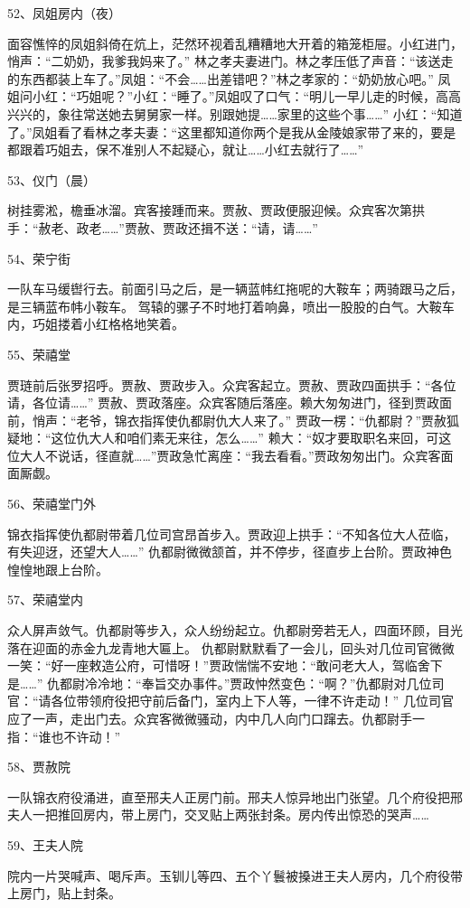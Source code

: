 52、凤姐房内（夜）\par
面容憔悴的凤姐斜倚在炕上，茫然环视着乱糟糟地大开着的箱笼柜屉。小红进门，悄声：“二奶奶，我爹我妈来了。”
林之孝夫妻进门。林之孝压低了声音：“该送走的东西都装上车了。”凤姐：“不会……出差错吧？”林之孝家的：“奶奶放心吧。”
凤姐问小红：“巧姐呢？”小红：“睡了。”凤姐叹了口气：“明儿一早儿走的时候，高高兴兴的，象往常送她去舅舅家一样。别跟她提……家里的这些个事……”
小红：“知道了。”凤姐看了看林之孝夫妻：“这里都知道你两个是我从金陵娘家带了来的，要是都跟着巧姐去，保不准别人不起疑心，就让……小红去就行了……”

53、仪门（晨）\par
树挂雾淞，檐垂冰溜。宾客接踵而来。贾赦、贾政便服迎候。众宾客次第拱手：“赦老、政老……”贾赦、贾政还揖不送：“请，请……”

54、荣宁街\par
一队车马缓辔行去。前面引马之后，是一辆蓝帏红拖呢的大鞍车；两骑跟马之后，是三辆蓝布帏小鞍车。
驾辕的骡子不时地打着响鼻，喷出一股股的白气。大鞍车内，巧姐搂着小红格格地笑着。

55、荣禧堂\par
贾琏前后张罗招呼。贾赦、贾政步入。众宾客起立。贾赦、贾政四面拱手：“各位请，各位请……”
贾赦、贾政落座。众宾客随后落座。赖大匆匆进门，径到贾政面前，悄声：“老爷，锦衣指挥使仇都尉仇大人来了。”
贾政一楞：“仇都尉？”贾赦狐疑地：“这位仇大人和咱们素无来往，怎么……”
赖大：“奴才要取职名来回，可这位大人不说话，径直就……”贾政急忙离座：“我去看看。”贾政匆匆出门。众宾客面面厮觑。

56、荣禧堂门外\par
锦衣指挥使仇都尉带着几位司宫昂首步入。贾政迎上拱手：“不知各位大人莅临，有失迎迓，还望大人……”
仇都尉微微颔首，并不停步，径直步上台阶。贾政神色惶惶地跟上台阶。

57、荣禧堂内\par
众人屏声敛气。仇都尉等步入，众人纷纷起立。仇都尉旁若无人，四面环顾，目光落在迎面的赤金九龙青地大匾上。
仇都尉默默看了一会儿，回头对几位司官微微一笑：“好一座敕造公府，可惜呀！”贾政惴惴不安地：“敢问老大人，驾临舍下是……”
仇都尉冷冷地：“奉旨交办事件。”贾政忡然变色：“啊？”仇都尉对几位司官：“请各位带领府役把守前后备门，室内上下人等，一律不许走动！”
几位司官应了一声，走出门去。众宾客微微骚动，内中几人向门口蹿去。仇都尉手一指：“谁也不许动！”

58、贾赦院\par
一队锦衣府役涌进，直至邢夫人正房门前。邢夫人惊异地出门张望。几个府役把邢夫人一把推回房内，带上房门，交叉贴上两张封条。房内传出惊恐的哭声……

59、王夫人院\par
院内一片哭喊声、喝斥声。玉钏儿等四、五个丫鬟被搡进王夫人房内，几个府役带上房门，贴上封条。

